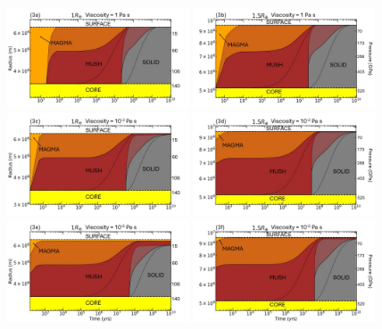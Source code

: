 \documentclass[fleqn,usenatbib]{mnras}
\begin{document}
\begin{figure}\centering
\includegraphics[width=0.48\textwidth]{3a.jpg}
\includegraphics[width=0.48\textwidth]{3b.jpg}
\includegraphics[width=0.48\textwidth]{3c.jpg}
\includegraphics[width=0.48\textwidth]{3d.jpg}
\includegraphics[width=0.48\textwidth]{3e.jpg}
\includegraphics[width=0.48\textwidth]{3f.jpg}


\end{figure}
\end{document}
